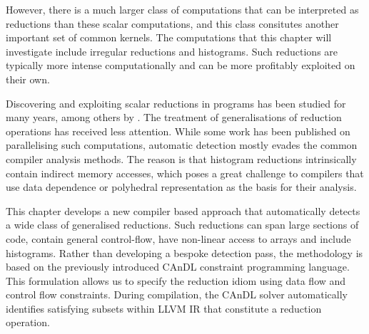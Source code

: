     However, there is a much larger class of computations that can be
    interpreted as reductions than these scalar computations, and this class
    consitutes another important set of common kernels.
    The computations that this chapter will investigate include irregular
    reductions and histograms.
    Such reductions are typically more intense computationally and can be
    more profitably exploited on their own.

    Discovering and exploiting scalar reductions in programs has been
    studied for many years, among others by \citet{pottenger1995idiom}.
    The treatment of generalisations of reduction operations has received less
    attention.
    While some work has been published on parallelising such computations,
    automatic detection mostly evades the common compiler analysis methods.
    The reason is that histogram reductions intrinsically contain indirect
    memory accesses, which poses a great challenge to compilers that use
    data dependence \citep{kuck1981dependence} or polyhedral
    representation \citep{benabderrahmane2010polyhedral} as the basis for
    their analysis.

%
    This chapter develops a new compiler based approach that automatically
    detects a wide class of generalised reductions.
    Such reductions can span large sections of code, contain general
    control-flow, have non-linear access to arrays and include histograms.
    Rather than developing a bespoke detection pass, the methodology is based on
    the previously introduced CAnDL constraint programming language.
    This formulation allows us to specify the reduction idiom using data flow
    and control flow constraints.
    During compilation, the CAnDL solver automatically identifies satisfying
    subsets within LLVM IR that constitute a reduction operation.

